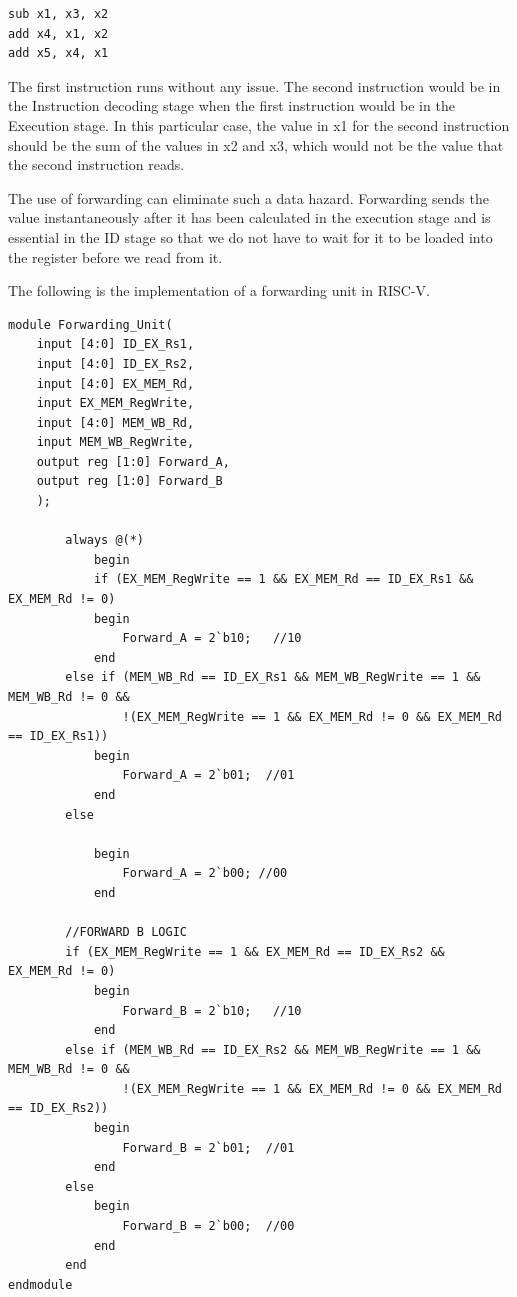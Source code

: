 \documentclass{article}
\begin{document}
\begin{lstlisting}[caption={Arbitrary Set of instructions}, captionpos=b, language=RISC-V]
sub x1, x3, x2
add x4, x1, x2
add x5, x4, x1
\end{lstlisting}

The first instruction runs without any issue. The second instruction would be in the Instruction decoding stage when the first instruction would be in the Execution stage. In this particular case, the value in x1 for the second instruction should be the sum of the values in x2 and x3, which would not be the value that the second instruction reads.

The use of forwarding can eliminate such a data hazard. Forwarding sends the value instantaneously after it has been calculated in the execution stage and is essential in the ID stage so that we do not have to wait for it to be loaded into the register before we read from it.

The following is the implementation of a forwarding unit in RISC-V. 

\begin{lstlisting}[caption={Forwarding Unit}, captionpos=b, language=RISC-V]
module Forwarding_Unit(
    input [4:0] ID_EX_Rs1,
    input [4:0] ID_EX_Rs2,
    input [4:0] EX_MEM_Rd,
    input EX_MEM_RegWrite,
    input [4:0] MEM_WB_Rd,
    input MEM_WB_RegWrite,
    output reg [1:0] Forward_A,
    output reg [1:0] Forward_B
    );
    
        always @(*)
            begin
            if (EX_MEM_RegWrite == 1 && EX_MEM_Rd == ID_EX_Rs1 && EX_MEM_Rd != 0)
            begin
                Forward_A = 2`b10;   //10
            end
        else if (MEM_WB_Rd == ID_EX_Rs1 && MEM_WB_RegWrite == 1 && MEM_WB_Rd != 0 &&
                !(EX_MEM_RegWrite == 1 && EX_MEM_Rd != 0 && EX_MEM_Rd == ID_EX_Rs1))
            begin
                Forward_A = 2`b01;  //01
            end
        else

            begin
                Forward_A = 2`b00; //00
            end

        //FORWARD B LOGIC
        if (EX_MEM_RegWrite == 1 && EX_MEM_Rd == ID_EX_Rs2 && EX_MEM_Rd != 0)
            begin
                Forward_B = 2`b10;   //10
            end
        else if (MEM_WB_Rd == ID_EX_Rs2 && MEM_WB_RegWrite == 1 && MEM_WB_Rd != 0 &&
                !(EX_MEM_RegWrite == 1 && EX_MEM_Rd != 0 && EX_MEM_Rd == ID_EX_Rs2))
            begin
                Forward_B = 2`b01;  //01
            end
        else  
            begin
                Forward_B = 2`b00;  //00
            end
        end
endmodule
\end{lstlisting}
\end{document}
